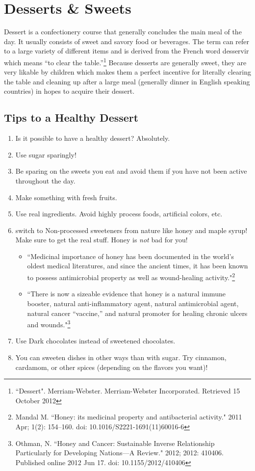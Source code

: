 \AddToShipoutPicture*{\AppleTartLarge}
\chapter{Desserts \& Sweets}

Dessert is a confectionery course that generally concludes the main meal of the day. It usually consists of sweet and savory food or beverages. The term can refer to a large variety of different items and is derived from the French word desservir which means ``to clear the table.''\footnote{``Dessert". Merriam-Webster. Merriam-Webster Incorporated. Retrieved 15 October 2012} Because desserts are generally sweet, they are very likable by children which makes them a perfect incentive for literally clearing the table and cleaning up after a large meal (generally dinner in English speaking countries) in hopes to acquire their dessert.

\section*{Tips to a Healthy Dessert}
\begin{enumerate}
	\item Is it possible to have a healthy dessert? Absolutely.
	\item Use sugar sparingly! 
	\item Be sparing on the sweets you eat and avoid them if you have not been active throughout the day.
	\item Make something with fresh fruits.
	\item Use real ingredients. Avoid highly process foods, artificial colors, etc.
	\item switch to Non-processed sweeteners from nature like honey and maple syrup! Make sure to get the real stuff. Honey is \textit{not} bad for you!
	\begin{itemize}
		\item ``Medicinal importance of honey has been documented in the world's oldest medical literatures, and since the ancient times, it has been known to possess antimicrobial property as well as wound-healing activity."\footnote{Mandal M. ``Honey: its medicinal property and antibacterial activity." 2011 Apr; 1(2): 154–160.	doi:  10.1016/S2221-1691(11)60016-6}
		\item ``There is now a sizeable evidence that honey is a natural immune booster, natural anti-inflammatory agent, natural antimicrobial agent, natural cancer “vaccine,” and natural promoter for healing chronic ulcers and wounds."\footnote{Othman, N. ``Honey and Cancer: Sustainable Inverse Relationship Particularly for Developing Nations—A Review." 2012; 2012: 410406. Published online 2012 Jun 17. doi:  10.1155/2012/410406}
	\end{itemize}
	\item Use Dark chocolates instead of sweetened chocolates.
	\item You can sweeten dishes in other ways than with sugar. Try cinnamon, cardamom, or other spices (depending on the flavors you want)!
\end{enumerate}